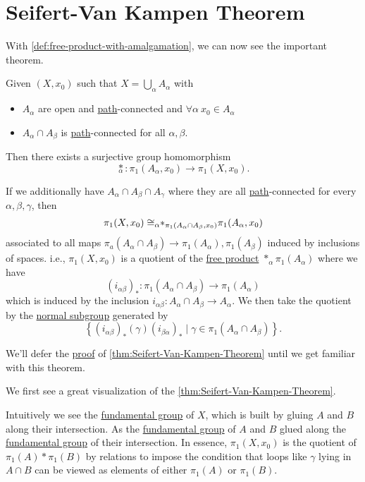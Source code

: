 \section{Seifert-Van Kampen Theorem}
With \autoref{def:free-product-with-amalgamation}, we can now see the important theorem.
\begin{theorem}\label{thm:Seifert-Van-Kampen-Theorem}
	Given \((X, x_0)\) such that \(X = \bigcup\limits_{\alpha } A_{\alpha }\) with
	\begin{itemize}
		\item \(A_{\alpha }\) are open and \hyperref[def:path]{path}-connected and \(\forall \alpha \ x_0\in A_{\alpha }\)
		\item \(A_{\alpha }\cap A_{\beta }\) is \hyperref[def:path]{path}-connected for all \(\alpha, \beta  \).
	\end{itemize}
	Then there exists a surjective group homomorphism
	\[
		\underset{\alpha }{\ast}\colon \pi _1(A_{\alpha }, x_0)\to \pi _1(X, x_0).
	\]

	\par If we additionally have \(A_{\alpha }\cap A_{\beta}\cap A_{\gamma}\) where they are all \hyperref[def:path]{path}-connected for every \(\alpha , \beta , \gamma\), then
	\[
		\pi _1(X, x_0)\cong _{\alpha }\hspace{-0.3em}\ast_{\pi _1(A_{\alpha }\cap A_{\beta }, x_0)}{}\pi _1(A_{\alpha }, x_0)
	\]
	associated to all maps \(\pi _a(A_{\alpha }\cap A_{\beta }) \to \pi _1 (A_{\alpha }), \pi _1(A_{\beta })\) induced by inclusions of spaces. i.e., \(\pi _1(X, x_0)\)
	is a quotient of the \hyperref[def:free-product-with-amalgamation]{free product} \(\ast_{\alpha}\pi _1(A_{\alpha })\) where we have
	\[
		(i_{\alpha \beta })_\ast\colon \pi _1(A_{\alpha }\cap A_{\beta })\to \pi _1(A_\alpha )
	\]
	which is induced by the inclusion \(i_{\alpha \beta }\colon A_{\alpha}\cap A_{\beta }\to A_{\alpha }\). We then take the quotient by the
	\hyperref[def:normal-subgroup]{normal subgroup} generated by
	\[
		\left\{(i_{\alpha \beta })_{\ast}(\gamma)(i_{\beta \alpha })_{\ast} \mid \gamma\in \pi _1(A_{\alpha }\cap A_{\beta })\right\}.
	\]
\end{theorem}
We'll defer the \hyperref[pf:thm:Seifert-Van-Kampen-Theorem]{proof} of \autoref{thm:Seifert-Van-Kampen-Theorem} until we get familiar with this theorem.
\begin{eg}
	We first see a great visualization of the \autoref{thm:Seifert-Van-Kampen-Theorem}.
	\begin{center}
	\end{center}
	Intuitively we see the \hyperref[def:fundamental-group]{fundamental group} of \(X\), which is built by gluing \(A\) and \(B\) along their intersection.
	As the \hyperref[def:fundamental-group]{fundamental group} of \(A\) and \(B\) glued along the \hyperref[def:fundamental-group]{fundamental group} of their
	intersection. In essence, \(\pi _1 (X, x_0)\) is the quotient of \(\pi _1(A)\ast \pi _1(B)\) by relations to impose the condition that loops like \(\gamma \)
	lying in \(A\cap B\) can be viewed as elements of either \(\pi _1(A)\) or \(\pi _1(B)\).
\end{eg}

